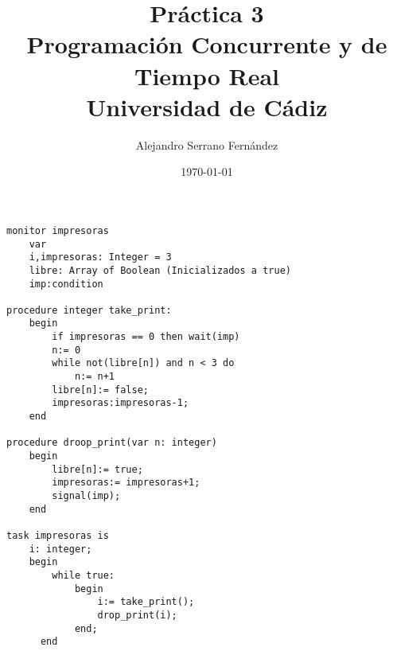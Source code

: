 \documentclass{article}
\title{Práctica 3 \\ Programación Concurrente y de Tiempo Real \\Universidad de Cádiz} %
\author{Alejandro Serrano Fernández} %
\date{\today} %
\begin{document}
\maketitle %

\begin{lstlisting}
monitor impresoras
	var
	i,impresoras: Integer = 3
	libre: Array of Boolean (Inicializados a true)
	imp:condition

procedure integer take_print:
	begin
		if impresoras == 0 then wait(imp)
		n:= 0
		while not(libre[n]) and n < 3 do
			n:= n+1
		libre[n]:= false;
		impresoras:impresoras-1;
	end

procedure droop_print(var n: integer)
	begin
		libre[n]:= true;
		impresoras:= impresoras+1;
		signal(imp);
	end

task impresoras is
	i: integer;
	begin
		while true:
			begin
				i:= take_print();
				drop_print(i);
			end;
	  end

\end{lstlisting}
\end{document}
